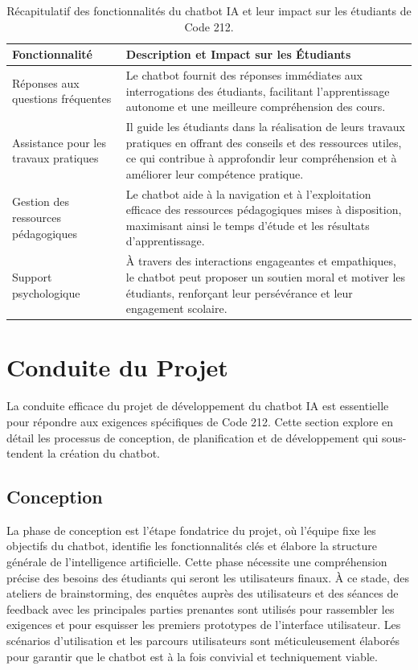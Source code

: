 \documentclass[a4paper, 11pt, openany]{report}
\begin{document}
\begin{table}[h!]
\centering
\begin{tabular}{|p{6cm}|p{10cm}|}
\hline
\textbf{Fonctionnalité} & \textbf{Description et Impact sur les Étudiants} \\ \hline
Réponses aux questions fréquentes & Le chatbot fournit des réponses immédiates aux interrogations des étudiants, facilitant l'apprentissage autonome et une meilleure compréhension des cours. \\ \hline
Assistance pour les travaux pratiques & Il guide les étudiants dans la réalisation de leurs travaux pratiques en offrant des conseils et des ressources utiles, ce qui contribue à approfondir leur compréhension et à améliorer leur compétence pratique. \\ \hline
Gestion des ressources pédagogiques & Le chatbot aide à la navigation et à l'exploitation efficace des ressources pédagogiques mises à disposition, maximisant ainsi le temps d'étude et les résultats d'apprentissage. \\ \hline
Support psychologique & À travers des interactions engageantes et empathiques, le chatbot peut proposer un soutien moral et motiver les étudiants, renforçant leur persévérance et leur engagement scolaire. \\ \hline
\end{tabular}
\caption{Récapitulatif des fonctionnalités du chatbot IA et leur impact sur les étudiants de Code 212.}
\label{tab:chatbotfeatures}
\end{table}

\section{Conduite du Projet}
La conduite efficace du projet de développement du chatbot IA est essentielle pour répondre aux exigences spécifiques de Code 212. Cette section explore en détail les processus de conception, de planification et de développement qui sous-tendent la création du chatbot.

\subsection{Conception}
La phase de conception est l'étape fondatrice du projet, où l'équipe fixe les objectifs du chatbot, identifie les fonctionnalités clés et élabore la structure générale de l'intelligence artificielle. Cette phase nécessite une compréhension précise des besoins des étudiants qui seront les utilisateurs finaux. À ce stade, des ateliers de brainstorming, des enquêtes auprès des utilisateurs et des séances de feedback avec les principales parties prenantes sont utilisés pour rassembler les exigences et pour esquisser les premiers prototypes de l'interface utilisateur. Les scénarios d'utilisation et les parcours utilisateurs sont méticuleusement élaborés pour garantir que le chatbot est à la fois convivial et techniquement viable.
\end{document}

